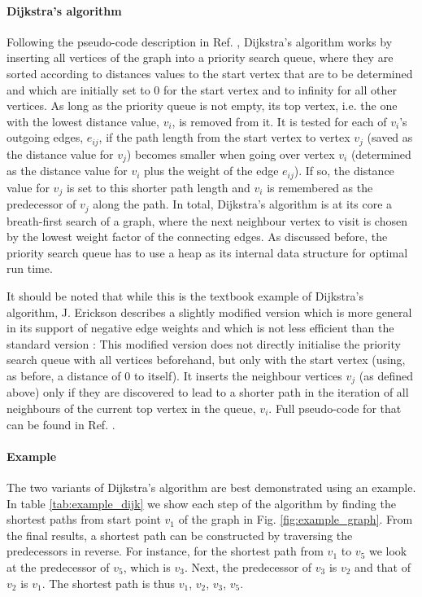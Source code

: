 \paragraph{Dijkstra's algorithm}
Following the pseudo-code description in Ref. \cite[p. 17, algo. 3]{FUH_algo_graphs_2021}, Dijkstra's algorithm
works by inserting all vertices of the graph into a priority search queue, where they are sorted according 
to distances values to the start vertex that are to be determined and which are initially set to $0$ for
the start vertex and to infinity for all other vertices.
As long as the priority queue is not empty, its top vertex, i.e. the one with the lowest distance value, 
$v_i$, is removed from it. 
It is tested for each of $v_i$'s outgoing edges, $e_{ij}$, if the path length from the start vertex to 
vertex $v_j$ (saved as the distance value for $v_j$) becomes smaller when going over vertex $v_i$ (determined
as the distance value for $v_i$ plus the weight of the edge $e_{ij}$). 
If so, the distance value for $v_j$ is set to this shorter path length and $v_i$ is remembered as the
predecessor of $v_j$ along the path.
In total, Dijkstra's algorithm is at its core a breath-first search of a graph, where the next neighbour 
vertex to visit is chosen by the lowest weight factor of the connecting edges.
As discussed before, the priority search queue has to use a heap as its internal data structure for
optimal run time.

It should be noted that while this is the textbook example of Dijkstra's algorithm, J. Erickson describes
a slightly modified version which is more general in its support of negative edge weights and which is not
less efficient than the standard version \cite[pp. 284-288]{Erickson2019}:
This modified version does not directly initialise the priority search queue with all vertices beforehand, 
but only with the start vertex (using, as before, a distance of $0$ to itself).
It inserts the neighbour vertices $v_j$ (as defined above) only if they are discovered to lead to a shorter 
path in the iteration of all neighbours of the current top vertex in the queue, $v_i$. Full pseudo-code 
for that can be found in Ref. \cite[p. 285]{Erickson2019}.

\paragraph{Example}
The two variants of Dijkstra's algorithm are best demonstrated using an example.
In table \ref{tab:example_dijk} we show each step of the algorithm by finding the shortest
paths from start point $v_1$ of the graph in Fig. \ref{fig:example_graph}.
From the final results, a shortest path can be constructed by traversing the predecessors in
reverse. For instance, for the shortest path from $v_1$ to $v_5$ we look at the predecessor
of $v_5$, which is $v_3$. Next, the predecessor of $v_3$ is $v_2$ and that of $v_2$ is $v_1$.
The shortest path is thus $v_1$, $v_2$, $v_3$, $v_5$.

